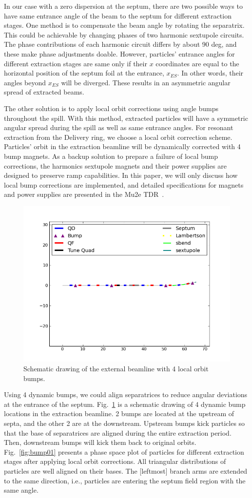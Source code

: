 \documentclass[aps,prstab,onecolumn,preprint,endfloats,11pt]{revtex4-1}
\begin{document}
In our case with a zero dispersion at the septum, there are two possible ways to have same entrance angle of the beam to the septum for different extraction stages.
One method is to compensate the beam angle by rotating the separatrix. This could be achievable by changing phases of two harmonic sextupole circuits.
The phase contributions of each harmonic circuit differs by about 90 deg, and these make phase adjustments doable.
However, particles' entrance angles for different extraction stages are same only if their $x$ coordinates are equal to the horizontal position of the septum foil at the entrance, $x_{ES}$.
In other words, their angles beyond $x_{ES}$ will be diverged.
These results in an asymmetric angular spread of extracted beams.

The other solution is to apply local orbit corrections using angle bumps throughout the spill.
With this method, extracted particles will have a symmetric angular spread during the spill as well as same entrance angles.
For resonant extraction from the Delivery ring, we choose a local orbit correction scheme.
Particles' orbit in the extraction beamline will be dynamically corrected with 4 bump magnets.
As a backup solution to prepare a failure of local bump corrections, the harmonics sextupole magnets and their power supplies are designed to preserve ramp capabilities.
In this paper, we will only discuss how local bump corrections are implemented, and detailed specifications for magnets and power supplies are presented in the Mu2e TDR~\cite{tdr}.

\begin{figure}[!tbp]
  \includegraphics[width=.45\textwidth]{img/20140109-00.png}
  \caption{\label{fig:bump1}Schematic drawing of the external beamline with 4 local orbit bumps.}
\end{figure}

Using 4 dynamic bumps, we could align separatrices to reduce angular deviations at the entrance of the septum.
Fig.~\ref{fig:bump1} is a schematic drawing of 4 dynamic bump locations in the extraction beamline.
2 bumps are located at the upstream of septa, and the other 2 are at the downstream.
Upstream bumps kick particles so that the base of separatrices are aligned during the entire extraction period.
Then, downstream bumps will kick them back to original orbits.
Fig.~\ref{fig:bump01} presents a phase space plot of particles for different extraction stages after applying local orbit corrections.
All triangular distributions of particles are well aligned on their bases.
The [leftmost] branch arms are extended to the same direction, i.e., particles are entering the septum field region with the same angle.
\end{document}
